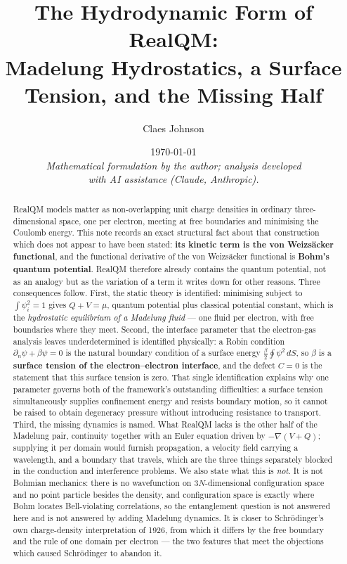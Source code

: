 \documentclass[11pt]{article}
\title{The Hydrodynamic Form of RealQM:\\
\large Madelung Hydrostatics, a Surface Tension, and the Missing Half}
\author[1]{Claes Johnson}
\affil[1]{KTH Royal Institute of Technology, SE-100 44 Stockholm, Sweden \\
\texttt{claesjohnson@gmail.com}}
\date{\today \\[0.4em]
\small\textit{Mathematical formulation by the author; analysis developed} \\
\small\textit{with AI assistance (Claude, Anthropic).}}
\newcommand{\grad}{\nabla}
\begin{document}
\maketitle

\begin{abstract}
\noindent RealQM models matter as non-overlapping unit charge densities in ordinary three-dimensional
space, one per electron, meeting at free boundaries and minimising the Coulomb energy. This note
records an exact structural fact about that construction which does not appear to have been stated:
\textbf{its kinetic term is the von Weizs\"acker functional}, and the functional derivative of the
von Weizs\"acker functional is \textbf{Bohm's quantum potential}. RealQM therefore already contains
the quantum potential, not as an analogy but as the variation of a term it writes down for other
reasons. Three consequences follow. First, the static theory is identified: minimising subject to
$\int\psi_i^2=1$ gives $Q+V=\mu$, quantum potential plus classical potential constant, which is the
\emph{hydrostatic equilibrium of a Madelung fluid} --- one fluid per electron, with free boundaries
where they meet. Second, the interface parameter that the electron-gas analysis leaves
underdetermined is identified physically: a Robin condition $\partial_n\psi+\beta\psi=0$ is the
natural boundary condition of a surface energy $\tfrac{\beta}{2}\oint\psi^2\,dS$, so $\beta$ is a
\textbf{surface tension of the electron--electron interface}, and the defect $C=0$ is the statement
that this surface tension is zero. That single identification explains why one parameter governs both
of the framework's outstanding difficulties: a surface tension simultaneously supplies confinement
energy and resists boundary motion, so it cannot be raised to obtain degeneracy pressure without
introducing resistance to transport. Third, the missing dynamics is named. What RealQM lacks is the
other half of the Madelung pair, continuity together with an Euler equation driven by
$-\grad(V+Q)$; supplying it per domain would furnish propagation, a velocity field carrying a
wavelength, and a boundary that travels, which are the three things separately blocked in the
conduction and interference problems. We also state what this is \emph{not}. It is not Bohmian
mechanics: there is no wavefunction on $3N$-dimensional configuration space and no point particle
besides the density, and configuration space is exactly where Bohm locates Bell-violating
correlations, so the entanglement question is not answered here and is not answered by adding
Madelung dynamics. It is closer to Schr\"odinger's own charge-density interpretation of 1926, from
which it differs by the free boundary and the rule of one domain per electron --- the two features
that meet the objections which caused Schr\"odinger to abandon it.
\end{abstract}
\end{document}
